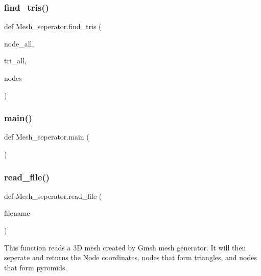 \subsubsection{\texorpdfstring{find\_tris()}{find\_tris()}}
{\footnotesize\ttfamily def Mesh\+\_\+seperator.\+find\+\_\+tris (\begin{DoxyParamCaption}\item[{}]{node\+\_\+all,  }\item[{}]{tri\+\_\+all,  }\item[{}]{nodes }\end{DoxyParamCaption})}

\mbox{\label{namespaceMesh__seperator_a090bb549dd0fba0519c35b7827245122}} 
\subsubsection{\texorpdfstring{main()}{main()}}
{\footnotesize\ttfamily def Mesh\+\_\+seperator.\+main (\begin{DoxyParamCaption}{ }\end{DoxyParamCaption})}

\mbox{\label{namespaceMesh__seperator_a954c8ddb9835123773ae8dce3b1ce39c}} 
\subsubsection{\texorpdfstring{read\_file()}{read\_file()}}
{\footnotesize\ttfamily def Mesh\+\_\+seperator.\+read\+\_\+file (\begin{DoxyParamCaption}\item[{}]{filename }\end{DoxyParamCaption})}

\begin{DoxyVerb}This function reads a 3D mesh created by Gmsh mesh generator. It will then seperate and returns the Node coordinates, 
nodes that form triangles, and nodes that form pyromids.\end{DoxyVerb}
 \mbox{\label{namespaceMesh__seperator_aee9199c38a0cdb313d24163ddf413de0}} 
